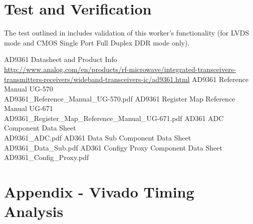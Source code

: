 \documentclass{article}
\begin{document}
\pagebreak
\section*{Test and Verification}
The test outlined in \cite{adc_comp_datasheet} includes validation of this worker's functionality (for LVDS mode and CMOS Single Port Full Duplex DDR mode only).

 \begin{thebibliography}{1}

 AD9361 Datasheet and Product Info \\
\url{http://www.analog.com/en/products/rf-microwave/integrated-transceivers-transmitters-receivers/wideband-transceivers-ic/ad9361.html}
  AD9361 Reference Manual UG-570\\
 AD9361\_Reference\_Manual\_UG-570.pdf
  AD9361 Register Map Reference Manual UG-671\\
 AD9361\_Register\_Map\_Reference\_Manual\_UG-671.pdf
  AD361 ADC Component Data Sheet \\AD9361\_ADC.pdf
  AD361 Data Sub Component Data Sheet \\AD9361\_Data\_Sub.pdf
  AD361 Configy Proxy Component Data Sheet \\AD9361\_Config\_Proxy.pdf

 \end{thebibliography}

\pagebreak
\section{Appendix - Vivado Timing Analysis} \label{appendix}
\end{document}
